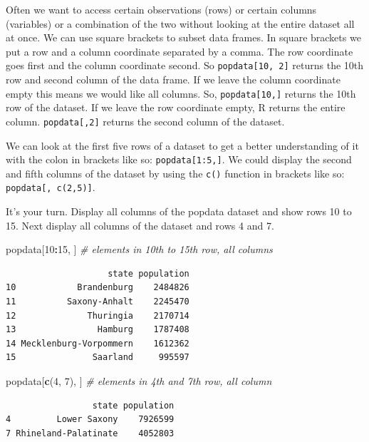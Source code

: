 \documentclass[]{book}
\newenvironment{Shaded}{\begin{snugshade}}{\end{snugshade}}
\newcommand{\KeywordTok}[1]{\textcolor[rgb]{0.13,0.29,0.53}{\textbf{#1}}}
\newcommand{\DecValTok}[1]{\textcolor[rgb]{0.00,0.00,0.81}{#1}}
\newcommand{\CommentTok}[1]{\textcolor[rgb]{0.56,0.35,0.01}{\textit{#1}}}
\newcommand{\OperatorTok}[1]{\textcolor[rgb]{0.81,0.36,0.00}{\textbf{#1}}}
\newcommand{\NormalTok}[1]{#1}
\theoremstyle{definition}
\theoremstyle{definition}
\theoremstyle{definition}
\theoremstyle{remark}
\begin{document}
Often we want to access certain observations (rows) or certain columns
(variables) or a combination of the two without looking at the entire
dataset all at once. We can use square brackets to subset data frames.
In square brackets we put a row and a column coordinate separated by a
comma. The row coordinate goes first and the column coordinate second.
So \texttt{popdata{[}10,\ 2{]}} returns the 10th row and second column
of the data frame. If we leave the column coordinate empty this means we
would like all columns. So, \texttt{popdata{[}10,{]}} returns the 10th
row of the dataset. If we leave the row coordinate empty, R returns the
entire column. \texttt{popdata{[},2{]}} returns the second column of the
dataset.

We can look at the first five rows of a dataset to get a better
understanding of it with the colon in brackets like so:
\texttt{popdata{[}1:5,{]}}. We could display the second and fifth
columns of the dataset by using the \texttt{c()} function in brackets
like so: \texttt{popdata{[},\ c(2,5){]}}.

It's your turn. Display all columns of the popdata dataset and show rows
10 to 15. Next display all columns of the dataset and rows 4 and 7.

\begin{Shaded}
\begin{Highlighting}[]
\NormalTok{popdata[}\DecValTok{10}\OperatorTok{:}\DecValTok{15}\NormalTok{, ] }\CommentTok{# elements in 10th to 15th row, all columns}
\end{Highlighting}
\end{Shaded}

\begin{verbatim}
                    state population
10            Brandenburg    2484826
11          Saxony-Anhalt    2245470
12              Thuringia    2170714
13                Hamburg    1787408
14 Mecklenburg-Vorpommern    1612362
15               Saarland     995597
\end{verbatim}

\begin{Shaded}
\begin{Highlighting}[]
\NormalTok{popdata[}\KeywordTok{c}\NormalTok{(}\DecValTok{4}\NormalTok{, }\DecValTok{7}\NormalTok{), ] }\CommentTok{# elements in 4th and 7th row, all column}
\end{Highlighting}
\end{Shaded}

\begin{verbatim}
                 state population
4         Lower Saxony    7926599
7 Rhineland-Palatinate    4052803
\end{verbatim}
\end{document}
